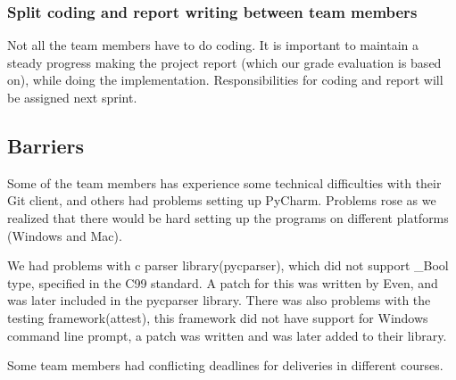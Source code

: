 \subsubsection{Split coding and report writing between team members} 
Not all the team members have to do coding. It is important to maintain a steady progress making the project report (which our grade evaluation is based on), while doing the implementation. Responsibilities for coding and report will be assigned next sprint. 

\subsection{Barriers}
Some of the team members has experience some technical difficulties with their Git client, and others had problems setting up PyCharm. Problems rose as we realized that there would be hard setting up the programs on different platforms (Windows and Mac).

We had problems with c parser library(pycparser), which did not support \_Bool type, specified in the C99 standard. A patch for this was written by Even, and was later included in the pycparser library. There was also problems with the testing framework(attest), this framework did not have support for Windows command line prompt, a patch was written and was later added to their library.

Some team members had conflicting deadlines for deliveries in different courses.  
